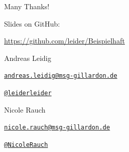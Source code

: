 {
\begin{frame}{Many Thanks!}

        Slides on GitHub:
        \vspace{-0.8em}
        \begin{center}
                \url{https://github.com/leider/Beispielhaft}
        \end{center}

        \begin{block}{Andreas Leidig}
        \begin{description}[Twitterxx]
                \item[E-Mail]  \href{mailto:andreas.leidig@msg-gillardon.de}{\texttt{andreas.leidig@msg-gillardon.de}}
                \item[Twitter] \href{http://twitter.com/leiderleider}{\texttt{@leiderleider}}
        \end{description}
        \end{block}

        \begin{block}{Nicole Rauch}
        \begin{description}[Twitterxx]
                \item[E-Mail]  \href{mailto:nicole.rauch@msg-gillardon.de}{\texttt{nicole.rauch@msg-gillardon.de}}
                \item[Twitter] \href{http://twitter.com/NicoleRauch}{\texttt{@NicoleRauch}}
        \end{description}
        \end{block}
\end{frame}
}

